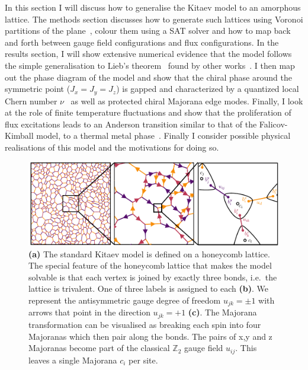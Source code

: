 In this section I will discuss how to generalise the Kitaev model to an amorphous lattice. The methods section discusses how to generate such lattices using Voronoi partitions of the plane~\autocite{mitchellAmorphousTopologicalInsulators2018,marsalTopologicalWeaireThorpeModels2020}, colour them using a SAT solver and how to map back and forth between gauge field configurations and flux configurations. In the results section, I will show extensive numerical evidence that the model follows the simple generalisation to Lieb's theorem~\autocite{lieb_flux_1994} found by other works~\autocite{eschmannThermodynamicClassificationThreedimensional2020,Yao2009,eschmann2019thermodynamics,Peri2020}. I then map out the phase diagram of the model and show that the chiral phase around the symmetric point (\(J_x = J_y = J_z\)) is gapped and characterized by a quantized local Chern number \(\nu\)~\autocite{peru_preprint,mitchellAmorphousTopologicalInsulators2018} as well as protected chiral Majorana edge modes. Finally, I look at the role of finite temperature fluctuations and show that the proliferation of flux excitations leads to an Anderson transition similar to that of the Falicov-Kimball model, to a thermal metal phase~\autocite{Laumann2012,lahtinenTopologicalLiquidNucleation2012,selfThermallyInducedMetallic2019}. Finally I consider possible physical realisations of this model and the motivations for doing so.

\hypertarget{fig:amk_zoom_by_hand}{%
\begin{figure}
\centering
\includegraphics[width=1\textwidth,height=\textheight]{figure_code/amk_chapter/intro/amk_zoom/amk_zoom_by_hand}
\caption[{The Kitaev Honeycomb Model}]{\textbf{(a)} The standard Kitaev model is defined on a honeycomb lattice. The special feature of the honeycomb lattice that makes the model solvable is that each vertex is joined by exactly three bonds, i.e.~the lattice is trivalent. One of three labels is assigned to each \textbf{(b)}. We represent the antisymmetric gauge degree of freedom \(u_{jk} = \pm 1\) with arrows that point in the direction \(u_{jk} = +1\) \textbf{(c)}. The Majorana transformation can be visualised as breaking each spin into four Majoranas which then pair along the bonds. The pairs of x,y and z Majoranas become part of the classical \(\mathbb{Z}_2\) gauge field \(u_{ij}\). This leaves a single Majorana \(c_i\) per site.}
\label{fig:amk_zoom_by_hand}
\end{figure}
}

